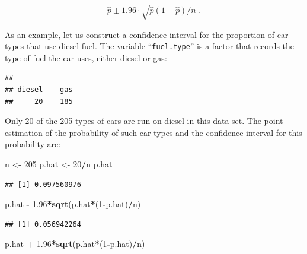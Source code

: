 \documentclass[]{krantz}
\makeatletter
\newenvironment{Shaded}{\begin{snugshade}}{\end{snugshade}}
\newcommand{\KeywordTok}[1]{\textcolor[rgb]{0.13,0.29,0.53}{\textbf{#1}}}
\newcommand{\DecValTok}[1]{\textcolor[rgb]{0.00,0.00,0.81}{#1}}
\newcommand{\FloatTok}[1]{\textcolor[rgb]{0.00,0.00,0.81}{#1}}
\newcommand{\StringTok}[1]{\textcolor[rgb]{0.31,0.60,0.02}{#1}}
\newcommand{\OperatorTok}[1]{\textcolor[rgb]{0.81,0.36,0.00}{\textbf{#1}}}
\newcommand{\NormalTok}[1]{#1}
\newenvironment{kframe}{%
\medskip{}
\setlength{\fboxsep}{.8em}
 \def\at@end@of@kframe{}%
 \ifinner\ifhmode%
  \def\at@end@of@kframe{\end{minipage}}%
  \begin{minipage}{\columnwidth}%
 \fi\fi%
 \def\FrameCommand##1{\hskip\@totalleftmargin \hskip-\fboxsep
 \colorbox{shadecolor}{##1}\hskip-\fboxsep
     \hskip-\linewidth \hskip-\@totalleftmargin \hskip\columnwidth}%
 \MakeFramed {\advance\hsize-\width
   \@totalleftmargin\z@ \linewidth\hsize
   \@setminipage}}%
 {\par\unskip\endMakeFramed%
 \at@end@of@kframe}
\renewenvironment{Shaded}{\begin{kframe}}{\end{kframe}}
\theoremstyle{definition}
\theoremstyle{definition}
\theoremstyle{definition}
\theoremstyle{remark}
\makeatother
\begin{document}
\[\hat p \pm 1.96 \cdot \sqrt{\hat p (1-\hat p)/n}\;.\]

As an example, let us construct a confidence interval for the proportion
of car types that use diesel fuel. The variable ``\texttt{fuel.type}''
is a factor that records the type of fuel the car uses, either diesel or
gas:

\begin{Shaded}
\end{Shaded}

\begin{verbatim}
## 
## diesel    gas 
##     20    185
\end{verbatim}

Only 20 of the 205 types of cars are run on diesel in this data set. The
point estimation of the probability of such car types and the confidence
interval for this probability are:

\begin{Shaded}
\begin{Highlighting}[]
\NormalTok{n <-}\StringTok{ }\DecValTok{205}
\NormalTok{p.hat <-}\StringTok{ }\DecValTok{20}\OperatorTok{/}\NormalTok{n}
\NormalTok{p.hat}
\end{Highlighting}
\end{Shaded}

\begin{verbatim}
## [1] 0.097560976
\end{verbatim}

\begin{Shaded}
\begin{Highlighting}[]
\NormalTok{p.hat }\OperatorTok{-}\StringTok{ }\FloatTok{1.96}\OperatorTok{*}\KeywordTok{sqrt}\NormalTok{(p.hat}\OperatorTok{*}\NormalTok{(}\DecValTok{1}\OperatorTok{-}\NormalTok{p.hat)}\OperatorTok{/}\NormalTok{n)}
\end{Highlighting}
\end{Shaded}

\begin{verbatim}
## [1] 0.056942264
\end{verbatim}

\begin{Shaded}
\begin{Highlighting}[]
\NormalTok{p.hat }\OperatorTok{+}\StringTok{ }\FloatTok{1.96}\OperatorTok{*}\KeywordTok{sqrt}\NormalTok{(p.hat}\OperatorTok{*}\NormalTok{(}\DecValTok{1}\OperatorTok{-}\NormalTok{p.hat)}\OperatorTok{/}\NormalTok{n)}
\end{Highlighting}
\end{Shaded}
\end{document}
